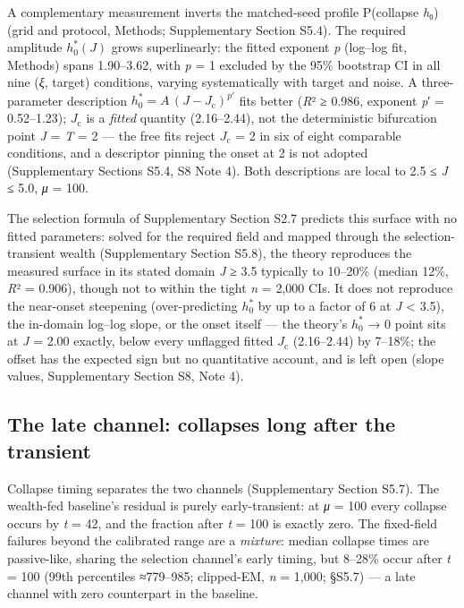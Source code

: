 \documentclass[11pt,letterpaper]{article}
\begin{document}
A complementary measurement inverts the matched-seed profile P(collapse \textbar{} \emph{h}₀) (grid and protocol, Methods; Supplementary Section S5.4). The required amplitude \(h_0^*(J)\) grows superlinearly: the fitted exponent \emph{p} (log--log fit, Methods) spans 1.90--3.62, with \emph{p} = 1 excluded by the 95\% bootstrap CI in all nine (\emph{ξ}, target) conditions, varying systematically with target and noise. A three-parameter description \(h_0^* = A\,(J - J_{\mathrm{c}})^{p'}\) fits better (\emph{R}² ≥ 0.986, exponent \emph{p}′ = 0.52--1.23); \(J_{\mathrm{c}}\) is a \emph{fitted} quantity (2.16--2.44), not the deterministic bifurcation point \emph{J} = \emph{T} = 2 --- the free fits reject \(J_{\mathrm{c}}\) = 2 in six of eight comparable conditions, and a descriptor pinning the onset at 2 is not adopted (Supplementary Sections S5.4, S8 Note 4). Both descriptions are local to 2.5 ≤ \emph{J} ≤ 5.0, \emph{μ} = 100.

The selection formula of Supplementary Section S2.7 predicts this surface with no fitted parameters: solved for the required field and mapped through the selection-transient wealth (Supplementary Section S5.8), the theory reproduces the measured surface in its stated domain \emph{J} ≥ 3.5 typically to 10--20\% (median 12\%, \emph{R}² = 0.906), though not to within the tight \emph{n} = 2,000 CIs. It does not reproduce the near-onset steepening (over-predicting \(h_0^*\) by up to a factor of 6 at \emph{J} \textless{} 3.5), the in-domain log--log slope, or the onset itself --- the theory's \(h_0^*\) → 0 point sits at \emph{J} = 2.00 exactly, below every unflagged fitted \(J_{\mathrm{c}}\) (2.16--2.44) by 7--18\%; the offset has the expected sign but no quantitative account, and is left open (slope values, Supplementary Section S8, Note 4).

\subsection{The late channel: collapses long after the transient}\label{the-late-channel-collapses-long-after-the-transient}

Collapse timing separates the two channels (Supplementary Section S5.7). The wealth-fed baseline's residual is purely early-transient: at \emph{μ} = 100 every collapse occurs by \emph{t} = 42, and the fraction after \emph{t} = 100 is exactly zero. The fixed-field failures beyond the calibrated range are a \emph{mixture}: median collapse times are passive-like, sharing the selection channel's early timing, but 8--28\% occur after \emph{t} = 100 (99th percentiles ≈779--985; clipped-EM, \emph{n} = 1,000; §S5.7) --- a late channel with zero counterpart in the baseline.
\end{document}
